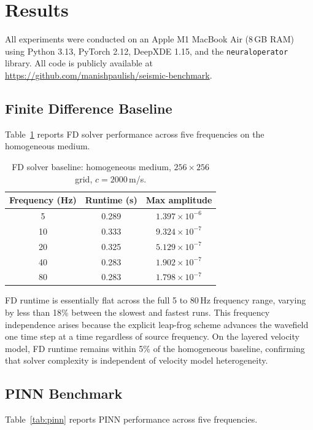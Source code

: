 \documentclass[12pt,a4paper]{article}
\begin{document}
\section{Results}
\label{sec:results}

All experiments were conducted on an Apple M1 MacBook Air (8\,GB
RAM) using Python 3.13, PyTorch 2.12, DeepXDE 1.15, and the
\texttt{neuraloperator} library. All code is publicly available
at \url{https://github.com/manishpaulish/seismic-benchmark}.

\subsection{Finite Difference Baseline}

Table~\ref{tab:fd} reports FD solver performance across five
frequencies on the homogeneous medium.

\begin{table}[H]
\centering
\caption{FD solver baseline: homogeneous medium,
$256\times256$ grid, $c=2000$\,m/s.}
\label{tab:fd}
\begin{tabular}{ccc}
\toprule
Frequency (Hz) & Runtime (s) & Max amplitude \\
\midrule
5  & 0.289 & $1.397 \times 10^{-6}$ \\
10 & 0.333 & $9.324 \times 10^{-7}$ \\
20 & 0.325 & $5.129 \times 10^{-7}$ \\
40 & 0.283 & $1.902 \times 10^{-7}$ \\
80 & 0.283 & $1.798 \times 10^{-7}$ \\
\bottomrule
\end{tabular}
\end{table}

FD runtime is essentially flat across the full 5 to 80\,Hz
frequency range, varying by less than 18\% between the slowest
and fastest runs. This frequency independence arises because the
explicit leap-frog scheme advances the wavefield one time step
at a time regardless of source frequency. On the layered velocity
model, FD runtime remains within 5\% of the homogeneous baseline,
confirming that solver complexity is independent of velocity model
heterogeneity.

\subsection{PINN Benchmark}

Table~\ref{tab:pinn} reports PINN performance across five
frequencies.
\end{document}
